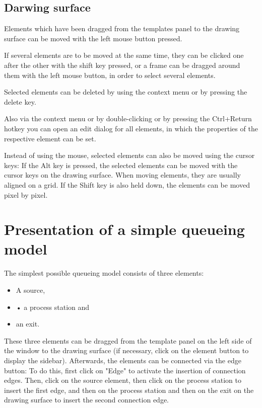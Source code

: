 \documentclass{svmono}
\begin{document}
\section{Darwing surface}

Elements which have been dragged from the templates panel to the drawing surface can be moved with the left mouse button pressed.

If several elements are to be moved at the same time, they can be clicked one after the other with the shift key pressed, or a frame can be dragged around them with the left mouse button, in order to select several elements.

Selected elements can be deleted by using the context menu or by pressing the delete key.

Also via the context menu or by double-clicking or by pressing the Ctrl+Return hotkey you can open an edit dialog for all elements, in which the properties of the respective element can be set.

Instead of using the mouse, selected elements can also be moved using the cursor keys: If the Alt key is pressed, the selected elements can be moved with the cursor keys on the drawing surface. When moving elements, they are usually aligned on a grid. If the Shift key is also held down, the elements can be moved pixel by pixel.



\chapter{Presentation of a simple queueing model}

The simplest possible queueing model consists of three elements:

\begin{itemize}
\item
A source,
\item
•	a process station and
\item
an exit.
\end{itemize}

These three elements can be dragged from the template panel on the left side of the window to the drawing surface (if necessary, click on the element button to display the sidebar). Afterwards, the elements can be connected via the edge button: To do this, first click on "Edge" to activate the insertion of connection edges. Then, click on the source element, then click on the process station to insert the first edge, and then on the process station and then on the exit on the drawing surface to insert the second connection edge.
 
\end{document}
